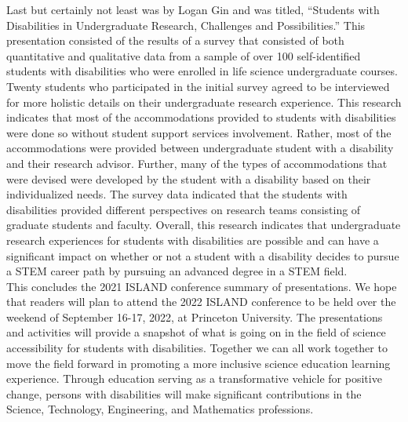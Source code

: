 \documentclass[11pt]{sig-alternate}
\begin{document}
\begin{large}
Last but certainly not least was by Logan Gin and was titled, “Students with Disabilities in Undergraduate Research, Challenges and Possibilities.” This presentation consisted of the results of a survey that consisted of both quantitative and qualitative data from a sample of over 100 self-identified students with disabilities who were enrolled in life science undergraduate courses. Twenty students who participated in the initial survey agreed to be interviewed for more holistic details on their undergraduate research experience. This research indicates that most of the accommodations provided to students with disabilities were done so without student support services involvement. Rather, most of the accommodations were provided between undergraduate student with a disability and their research advisor. Further, many of the types of accommodations that were devised were developed by the student with a disability based on their individualized needs. The survey data indicated that the students with disabilities provided different perspectives on research teams consisting of graduate students and faculty. Overall, this research indicates that undergraduate research experiences for students with disabilities are possible and can have a significant impact on whether or not a student with a disability decides to pursue a STEM career path by pursuing an advanced degree in a STEM field.\\

This concludes the 2021 ISLAND conference summary of presentations. We hope that readers will plan to attend the 2022 ISLAND conference to be held over the weekend of September 16-17, 2022, at Princeton University. The presentations and activities will provide a snapshot of what is going on in the field of science accessibility for students with disabilities. Together we can all work together to move the field forward in promoting a more inclusive science education learning experience. Through education serving as a transformative vehicle for positive change, persons with disabilities will make significant contributions in the Science, Technology, Engineering, and Mathematics professions. 

\end{large}
\end{document}
